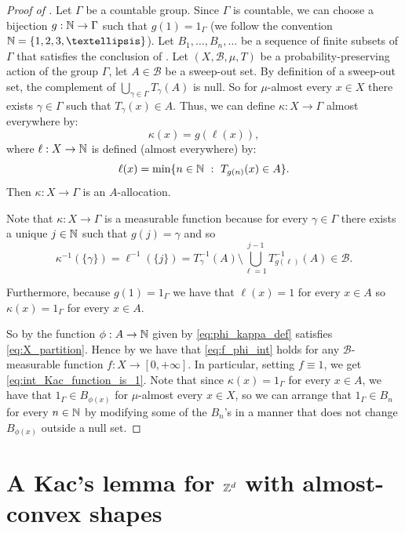 \documentclass[12pt,reqno]{amsart}
\begin{document}
\begin{proof}[Proof of ]
    Let $\Gamma$ be a countable group.
    Since $\Gamma$ is countable, we can choose a bijection $g:\mathbb{N} \to \Gamma$ such that $g(1)=1_\Gamma$ (we follow the convention  $\N=\{1,2,3,\ldots\}$). 
    Let $B_1,\ldots,B_n,\ldots$ be a sequence of finite subsets of $\Gamma$ that satisfies the conclusion of . Let 
     $(X,\mathcal{B},\mu,T)$ be a  probability-preserving action of the group $\Gamma$, let $A \in \mathcal{B}$ be a sweep-out set.
    By definition of a sweep-out set, the complement of $\bigcup_{\gamma \in \Gamma}T_\gamma(A)$ is null. So for $\mu$-almost every $x \in X$ there exists $\gamma \in \Gamma$ such that $T_\gamma(x) \in A$.
    Thus, we can define $\kappa:X \to \Gamma$ almost everywhere by:
    \[
    \kappa(x) = g(\ell(x)), 
    \]
    where $\ell:X \to \mathbb{N}$ is defined (almost everywhere) by:
    \[
    \ell(x) = \min \{ n \in \mathbb{N}~:~ T_{g(n)}(x) \in A\}.
    \]
    Then $\kappa:X \to \Gamma$ is an $A$-allocation.
    
    Note that $\kappa:X \to \Gamma$ is a measurable function because
    for every $\gamma \in \Gamma$ there exists a unique $j \in \mathbb{N}$ such that $g(j)=\gamma$ and so
    \[
    \kappa^{-1}(\{\gamma\})=\ell^{-1}(\{j\}) = T_{\gamma}^{-1}(A)\setminus \bigcup_{\ell=1}^{j-1}T^{-1}_{g(\ell)}(A) \in \mathcal{B}.
    \]
    
    Furthermore, because $g(1)=1_\Gamma$ we have that $\ell(x)=1$ for every $x \in A$ so $\kappa(x)=1_\Gamma$ for every $x \in A$.
    
    So by 
    the function $\phi:A \to \mathbb{N}$ given by \eqref{eq:phi_kappa_def} satisfies \eqref{eq:X_partition}. Hence by  we have that \eqref{eq:f_phi_int} holds for any $\mathcal{B}$-measurable function $f:X \to [0,+\infty]$. In particular, setting $f \equiv 1$, we get \eqref{eq:int_Kac_function_is_1}. Note that since $\kappa(x)=1_\Gamma$ for every $x \in A$, we have that $1_\Gamma \in B_{\phi(x)}$ for $\mu$-almost every $x \in X$, so we can arrange that $1_\Gamma \in B_n$ for every $n \in\mathbb{N}$ by modifying some of the $B_n$'s in a manner that does not change $B_{\phi(x)}$ outside a null set.
\end{proof}
\section{A Kac's lemma for $\mathbb{Z}^d$ with almost-convex shapes}
\end{document}
